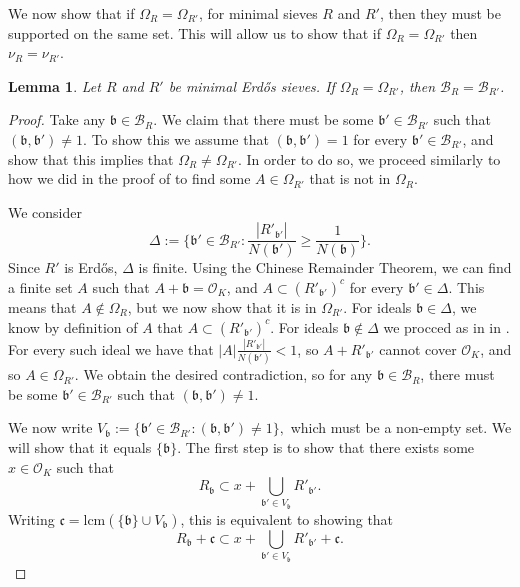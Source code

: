 \documentclass[a4paper,11pt,reqno]{amsart}
\theoremstyle{plain}
\newtheorem{lemma}[theorem]{Lemma}
\theoremstyle{remark}
\newcommand{\cb}{\mathcal{B}}
\newcommand{\cbr}{\mathcal{B}_R}
\newcommand{\co}{\mathcal{O}}
\newcommand{\gb}{\mathfrak{b}}
\newcommand{\gc}{\mathfrak{c}}
\begin{document}
			We now show that if $\Omega_R = \Omega_{R'}$, for minimal sieves $R$ and $R'$, then they must be supported on the same set. This will allow us to show that if $\Omega_R = \Omega_{R'}$ then $\nu_R = \nu_{R'}$.
			
			\begin{lemma}
				\label{lm: OmegaR =omegar' implies equality of base}
				Let $R$ and $R'$ be minimal Erdős sieves. If $\Omega_{R} = \Omega_{R'}$, then $\cb_R = \cb_{R'}$. 
			\end{lemma}
			
			\begin{proof}
				Take any $\gb \in \cb_R$. We claim that there must be some $\gb' \in \cb_{R'}$ such that $(\gb,\gb') \neq 1$. To show this we assume that  $(\gb,\gb') = 1$ for every $\gb' \in \cb_{R'}$, and show that this implies that $\Omega_{R} \neq \Omega_{R'}$. In order to do so, we proceed similarly to how we did in the proof of   to find some $A \in \Omega_{R'}$ that is not in $\Omega_R$.
				
				We consider $$\Delta := \{\gb'\in \cb_{R'}: \frac{|R'_{\gb'}|}{N(\gb')} \geq \frac{1}{N(\gb)}\}.$$ Since $R'$ is Erdős, $\Delta$ is finite. Using the Chinese Remainder Theorem, we can find a finite set $A$ such that $A+ \gb = \co_K$, and $A \subset (R'_{\gb'})^c$ for every $\gb' \in \Delta$. This means that $A \not \in \Omega_R$, but we now show that it is in $\Omega_{R'}$. For ideals $\gb\in \Delta$, we  know by definition of $A$ that $A \subset (R'_{\gb'})^c$. For ideals $\gb \not \in \Delta$ we procced as in in  . For every such ideal we have that $|A|\frac{|R'_{\gb'}|}{N(\gb')}  < 1$, so $A+ R'_{\gb'}$ cannot cover $\co_K$, and so  $A \in \Omega_{R'}$. We obtain the desired contradiction, so for any $\gb \in \cbr$, there must be some $\gb' \in \cb_{R'}$ such that $(\gb,\gb') \neq 1$.
				
				We now write $V_{\gb} := \{\gb' \in \cb_{R'}: (\gb, \gb') \neq 1 \},$ which must be a non-empty set. We will show that it equals $\{\gb\}$. The first step is to show that there exists some $x \in \co_K$ such that \begin{equation}
					\label{eq: Rgb subset of union}
					R_\gb \subset x+ \bigcup_{\gb' \in V_\gb} R'_{\gb'}.
				\end{equation}
				Writing $\gc = \text{lcm}(\{\gb\}\cup V_\gb)$, this is equivalent to showing that $$R_\gb + \gc \subset x+ \bigcup_{\gb' \in V_\gb} R'_{\gb'} + \gc.$$
				

\end{proof}
\end{document}
